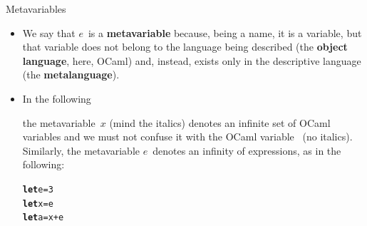 \documentclass[compress,dvipdfmx]{beamer}
\newcommand{\OCaml}{\textsf{OCaml}\xspace}
\begin{document}
%
\begin{frame}[fragile]{Metavariables}

  \begin{itemize}

    \item We say that \(e\)~is a \textbf{metavariable} because, being
      a name, it is a variable, but that variable does not belong to
      the language being described (the \textbf{object language},
      here, \OCaml) and, instead, exists only in the descriptive
      language (the \textbf{metalanguage}).

    \item In the following
      \begin{center}
      \end{center}
      the metavariable~\(x\) (mind the italics) denotes an infinite
      set of \OCaml variables and we must not confuse it with the
      \OCaml variable~ (no italics). Similarly, the
      metavariable \(e\)~denotes an infinity of expressions, as in the
      following:
      \vspace*{-3mm}
\begin{alltt}
\small
\textbf{let} e = 3
\textbf{let} x = e
\textbf{let} a = x + e
\end{alltt}

  \end{itemize}

\end{frame}
\end{document}
